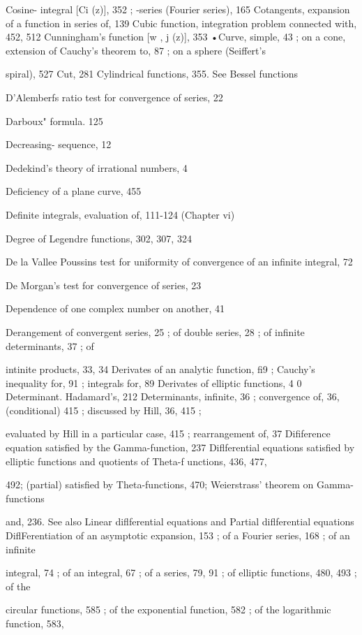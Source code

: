 Cosine- integral [Ci (z)], 352 ; -series (Fourier series), 165
Cotangents, expansion of a function in series of, 139
Cubic function, integration problem connected with, 452, 512
Cunningham's function [w ,  j (z)], 353
•Curve, simple, 43 ; on a cone, extension of Cauchy's theorem to, 87 ; on a sphere (Seiffert's

spiral), 527
Cut, 281
Cylindrical functions, 355. See Bessel functions

%
%
D'Alemberfs ratio test for convergence of series, 22

Darboux" formula. 125

Decreasing- sequence, 12

Dedekind's theory of irrational numbers, 4

Deficiency of a plane curve, 455

Definite integrals, evaluation of, 111-124 (Chapter vi)

Degree of Legendre functions, 302, 307, 324

De la Vallee Poussins test for uniformity of convergence of an infinite integral, 72

De Morgan's test for convergence of series, 23

Dependence of one complex number on another, 41

Derangement of convergent series, 25 ; of double series, 28 ; of infinite determinants, 37 ; of

intinite products, 33, 34
Derivates of an analytic function, fi9 ; Cauchy's inequality for, 91 ; integrals for, 89
Derivates of elliptic functions, 4 0
Determinant. Hadamard's, 212
Determinants, infinite, 36 ; convergence of, 36, (conditional) 415 ; discussed by Hill, 36, 415 ;

evaluated by Hill in a particular case, 415 ; rearrangement of, 37
Difiference equation satisfied by the Gamma-function, 237
Diflferential equations satisfied by elliptic functions and quotients of Theta-f unctions, 436, 477,

492; (partial) satisfied by Theta-functions, 470; Weierstrass' theorem on Gamma-functions

and, 236. See also Linear diflferential equations and Partial diflferential equations
DiflFerentiation of an asymptotic expansion, 153 ; of a Fourier series, 168 ; of an infinite

integral, 74 ; of an integral, 67 ; of a series, 79, 91 ; of elliptic functions, 480, 493 ; of the

circular functions, 585 ; of the exponential function, 582 ; of the logarithmic function, 583,

